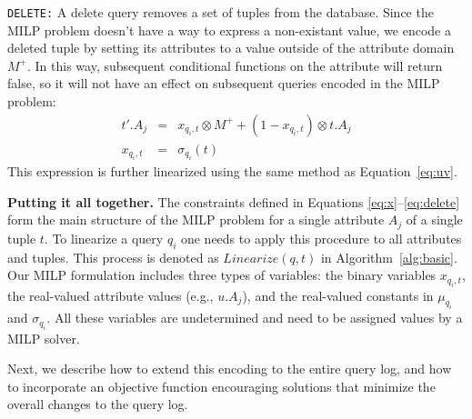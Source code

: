 \smallskip
\noindent
\texttt{DELETE:}
A delete query removes a set of tuples from the database.  
Since the MILP problem doesn't have a way to express a non-existant value, 
we encode a deleted tuple by setting its attributes to a value
outside of the attribute domain $M^+$.  In this way, subsequent conditional functions
on the attribute will return false, so it will not have an effect on subsequent queries encoded
in the MILP problem:
\begin{eqnarray}
\label{eq:delete}
t'.A_j &=& x_{q_i, t} \otimes M^+ + (1-x_{q_i, t}) \otimes t.A_j \\
x_{q_i, t} &=& \sigma_{q_i}(t)\nonumber 
\end{eqnarray}
This expression is further linearized using the same method as Equation~\eqref{eq:uv}.

\smallskip
\noindent
\textbf{Putting it all together.}
% 
The constraints defined in Equations \eqref{eq:x}--\eqref{eq:delete}
form the main structure of the MILP problem for a single attribute
$A_j$ of a single tuple $t$. To linearize a query $q_i$ one needs to
apply this procedure to all attributes and tuples. This process is
denoted as $Linearize(q, t)$ in Algorithm~\ref{alg:basic}. Our MILP
formulation includes three types of variables: the binary variables
$x_{q_i, t}$, the real-valued attribute values (e.g., $u.A_j$), and
the real-valued constants in $\mu_{q_i}$ and $\sigma_{q_i}$. All these
variables are undetermined and need to be assigned values by a MILP
solver.


Next, we describe how to extend this encoding to the entire query log,
and how to incorporate an objective function encouraging solutions
that minimize the overall changes to the query log.







